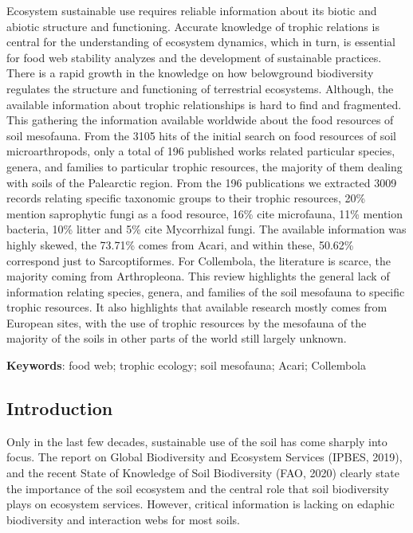 \documentclass[11pt]{article}
\begin{document}
Ecosystem sustainable use requires reliable information about its biotic
and abiotic structure and functioning. Accurate knowledge of trophic
relations is central for the understanding of ecosystem dynamics, which
in turn, is essential for food web stability analyzes and the
development of sustainable practices. There is a rapid growth in the
knowledge on how belowground biodiversity regulates the structure and
functioning of terrestrial ecosystems. Although, the available
information about trophic relationships is hard to find and fragmented.
This gathering the information available worldwide about the food
resources of soil mesofauna. From the 3105 hits of the initial search on
food resources of soil microarthropods, only a total of 196 published
works related particular species, genera, and families to particular
trophic resources, the majority of them dealing with soils of the
Palearctic region. From the 196 publications we extracted 3009 records
relating specific taxonomic groups to their trophic resources, 20\%
mention saprophytic fungi as a food resource, 16\% cite microfauna, 11\%
mention bacteria, 10\% litter and 5\% cite Mycorrhizal fungi. The
available information was highly skewed, the 73.71\% comes from Acari,
and within these, 50.62\% correspond just to Sarcoptiformes. For
Collembola, the literature is scarce, the majority coming from
Arthropleona. This review highlights the general lack of information
relating species, genera, and families of the soil mesofauna to specific
trophic resources. It also highlights that available research mostly
comes from European sites, with the use of trophic resources by the
mesofauna of the majority of the soils in other parts of the world still
largely unknown.

\textbf{Keywords}: food web; trophic ecology; soil mesofauna; Acari;
Collembola

\hypertarget{introduction}{%
\subsection{Introduction}\label{introduction}}

Only in the last few decades, sustainable use of the soil has come
sharply into focus. The report on Global Biodiversity and Ecosystem
Services (IPBES, 2019), and the recent State of Knowledge of Soil
Biodiversity (FAO, 2020) clearly state the importance of the soil
ecosystem and the central role that soil biodiversity plays on ecosystem
services. However, critical information is lacking on edaphic
biodiversity and interaction webs for most soils.
\end{document}
